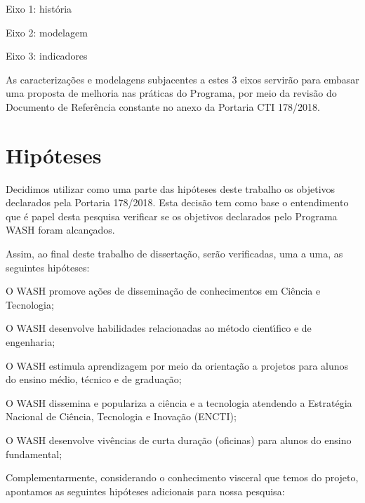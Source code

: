 \documentclass[
12pt,		%
openright,	%
twoside,  %
a4paper,			%
chapter=TITLE,		%
english,			%
french,				%
spanish,			%
brazil				%
]{USPSC-classe/USPSC}
\begin{document}
\begin{alineas}
\item Eixo 1: hist\'oria
\item Eixo 2: modelagem
\item Eixo 3: indicadores
\end{alineas}

As caracteriza\c{c}\~oes e modelagens subjacentes a estes 3 eixos servir\~ao para embasar uma proposta de melhoria nas pr\'aticas do Programa, por meio da revis\~ao do Documento de Refer\^encia constante no anexo da Portaria CTI 178/2018.




\section[Hip\'oteses]{Hip\'oteses}\label{Hip\'oteses}
Decidimos utilizar como uma parte das hip\'oteses deste trabalho os objetivos declarados pela Portaria 178/2018. Esta decis\~ao tem como base o entendimento que \'e papel desta pesquisa verificar se os objetivos declarados pelo Programa WASH foram alcan\c{c}ados.




Assim, ao final deste trabalho de disserta\c{c}\~ao, ser\~ao verificadas, uma a uma, as seguintes hip\'oteses:





\begin{alineas}
\item O WASH promove a\c{c}\~oes de dissemina\c{c}\~ao de conhecimentos em Ci\^encia e Tecnologia;
\item O WASH desenvolve habilidades relacionadas ao m\'etodo cient\'{\i}fico e de engenharia;
\item O WASH estimula aprendizagem por meio da orienta\c{c}\~ao a projetos para alunos do ensino m\'edio, t\'ecnico e de gradua\c{c}\~ao;
\item O WASH dissemina e populariza a ci\^encia e a tecnologia atendendo a Estrat\'egia Nacional de Ci\^encia, Tecnologia e Inova\c{c}\~ao (ENCTI);
\item O WASH desenvolve viv\^encias de curta dura\c{c}\~ao (oficinas) para alunos do ensino fundamental;
\end{alineas}

Complementarmente, considerando o conhecimento visceral que temos do projeto, apontamos as seguintes hip\'oteses adicionais para nossa pesquisa:
\end{document}
